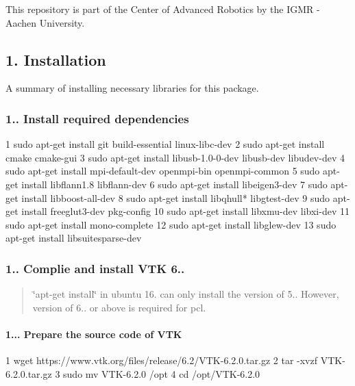  This repository is part of the Center of Advanced Robotics by the I\+G\+MR -\/ Aachen University. 



\subsection*{1. Installation}

A summary of installing necessary libraries for this package. 



\subsubsection*{1.. Install required dependencies}


\begin{DoxyCode}
1 sudo apt-get install git build-essential linux-libc-dev
2 sudo apt-get install cmake cmake-gui
3 sudo apt-get install libusb-1.0-0-dev libusb-dev libudev-dev
4 sudo apt-get install mpi-default-dev openmpi-bin openmpi-common
5 sudo apt-get install libflann1.8 libflann-dev
6 sudo apt-get install libeigen3-dev
7 sudo apt-get install libboost-all-dev
8 sudo apt-get install libqhull* libgtest-dev
9 sudo apt-get install freeglut3-dev pkg-config
10 sudo apt-get install libxmu-dev libxi-dev
11 sudo apt-get install mono-complete
12 sudo apt-get install libglew-dev
13 sudo apt-get install libsuitesparse-dev
\end{DoxyCode}




\subsubsection*{1.. Complie and install V\+TK 6..}

\begin{quote}
\char`\"{}apt-\/get install\char`\"{} in ubuntu 16. can only install the version of 5.. However, version of 6.. or above is required for pcl. \end{quote}


\paragraph*{1... Prepare the source code of V\+TK}


\begin{DoxyCode}
1 wget https://www.vtk.org/files/release/6.2/VTK-6.2.0.tar.gz
2 tar -xvzf VTK-6.2.0.tar.gz
3 sudo mv VTK-6.2.0 /opt
4 cd /opt/VTK-6.2.0
\end{DoxyCode}


